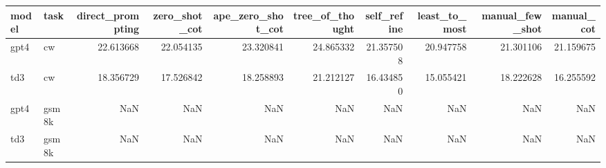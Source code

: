 \begin{tabular}{llrrrrrrrr}
\toprule
model & task & direct_prompting & zero_shot_cot & ape_zero_shot_cot & tree_of_thought & self_refine & least_to_most & manual_few_shot & manual_cot \\
\midrule
gpt4 & cw & 22.613668 & 22.054135 & 23.320841 & 24.865332 & 21.357508 & 20.947758 & 21.301106 & 21.159675 \\
td3 & cw & 18.356729 & 17.526842 & 18.258893 & 21.212127 & 16.434850 & 15.055421 & 18.222628 & 16.255592 \\
gpt4 & gsm8k & NaN & NaN & NaN & NaN & NaN & NaN & NaN & NaN \\
td3 & gsm8k & NaN & NaN & NaN & NaN & NaN & NaN & NaN & NaN \\
\bottomrule
\end{tabular}
